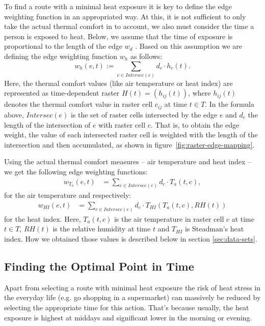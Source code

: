 To find a route with a minimal heat exposure it is key to define the edge weighting function in an appropriated way. At this, it is not sufficient to only take the actual thermal comfort in to account, we also must consider the time a person is exposed to heat. Below, we assume that the time of exposure is proportional to the length of the edge $w_d$ \parencite[following][]{Hasenfratz2015}. Based on this assumption we are defining the edge weighting function $w_h$ as follows: 
\begin{equation}\label{eq:edge-weight}
w_h(e, t) := \sum_{c \in Intersec(e)} d_c \cdot h_c(t).
\end{equation}
Here, the thermal comfort values (like air temperature or heat index) are represented as time-dependent raster $H(t) = \left(h_{ij}(t)\right)$, where $h_{ij}(t)$ denotes the thermal comfort value in raster cell $c_{ij}$ at time $t \in T$. In the formula above, $Intersec(e)$ is the set of raster cells intersected by the edge $e$ and $d_c$ the length of the intersection of $e$ with raster cell $c$.  That is, to obtain the edge weight, the value of each intersected raster cell is weighted with the length of the intersection and then accumulated, as shown in figure~\ref{fig:raster-edge-mapping}.

Using the actual thermal comfort measures -- air temperature and heat index -- we get the following edge weighting functions:
\begin{align}
	\label{eq:edge-weight-temperature}
	w_{T_a}(e,t)& = \sum_{c \in Intersec(e)} d_c \cdot T_a(t, c),
\end{align}
for the air temperature and respectively:
\begin{align}
	\label{eq:edge-weight-heatindex}
	w_{HI}(e,t)& = \sum_{c \in Intersec(e)} d_c \cdot T_{HI}\left(T_a(t, c), RH(t)\right)
\end{align}
for the heat index. Here, $T_a(t,c)$ is the air temperature in raster cell $c$ at time $t \in T$, $RH(t)$ is the relative humidity at time $t$ and $T_{HI}$ is Steadman's heat index. How we obtained those values is described below in section \ref{sec:data-sets}.

 \subsection{Finding the Optimal Point in Time \label{sec:find-optimal-time}}
 
 Apart from selecting a route with minimal heat exposure the risk of heat stress in the everyday life (e.g. go shopping in a supermarket) can massively be reduced by selecting the appropriate time for this action. That's because usually, the heat exposure is highest at middays and significant lower in the morning or evening.
 
